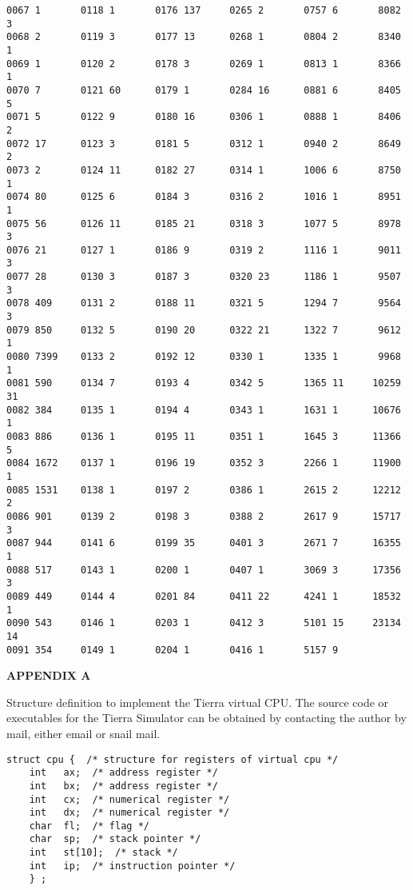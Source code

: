 \begin{verbatim}
0067 1       0118 1       0176 137     0265 2       0757 6       8082 3
0068 2       0119 3       0177 13      0268 1       0804 2       8340 1
0069 1       0120 2       0178 3       0269 1       0813 1       8366 1
0070 7       0121 60      0179 1       0284 16      0881 6       8405 5
0071 5       0122 9       0180 16      0306 1       0888 1       8406 2
0072 17      0123 3       0181 5       0312 1       0940 2       8649 2
0073 2       0124 11      0182 27      0314 1       1006 6       8750 1
0074 80      0125 6       0184 3       0316 2       1016 1       8951 1
0075 56      0126 11      0185 21      0318 3       1077 5       8978 3
0076 21      0127 1       0186 9       0319 2       1116 1       9011 3
0077 28      0130 3       0187 3       0320 23      1186 1       9507 3
0078 409     0131 2       0188 11      0321 5       1294 7       9564 3
0079 850     0132 5       0190 20      0322 21      1322 7       9612 1
0080 7399    0133 2       0192 12      0330 1       1335 1       9968 1
0081 590     0134 7       0193 4       0342 5       1365 11     10259 31
0082 384     0135 1       0194 4       0343 1       1631 1      10676 1
0083 886     0136 1       0195 11      0351 1       1645 3      11366 5
0084 1672    0137 1       0196 19      0352 3       2266 1      11900 1
0085 1531    0138 1       0197 2       0386 1       2615 2      12212 2
0086 901     0139 2       0198 3       0388 2       2617 9      15717 3
0087 944     0141 6       0199 35      0401 3       2671 7      16355 1
0088 517     0143 1       0200 1       0407 1       3069 3      17356 3
0089 449     0144 4       0201 84      0411 22      4241 1      18532 1
0090 543     0146 1       0203 1       0412 3       5101 15     23134 14
0091 354     0149 1       0204 1       0416 1       5157 9
\end{verbatim}

\newpage

\LP
\bf APPENDIX A\rm
\eLP

Structure definition to implement the Tierra virtual CPU.
The source code or executables for the Tierra Simulator can be obtained by
contacting the author by mail, either email or snail mail.

\begin{verbatim}
struct cpu {  /* structure for registers of virtual cpu */
    int   ax;  /* address register */
    int   bx;  /* address register */
    int   cx;  /* numerical register */
    int   dx;  /* numerical register */
    char  fl;  /* flag */
    char  sp;  /* stack pointer */
    int   st[10];  /* stack */
    int   ip;  /* instruction pointer */
    } ;
\end{verbatim}


